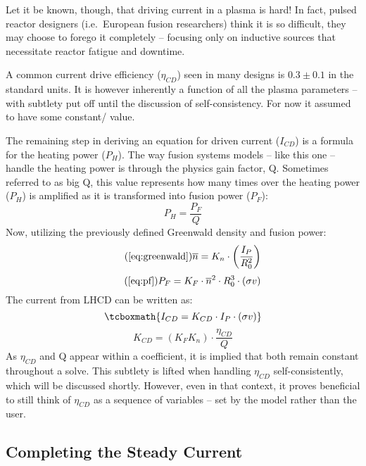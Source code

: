 Let it be known, though, that driving current in a plasma is hard! In fact, pulsed reactor designers (i.e.\ European fusion researchers) think it is so difficult, they may choose to forego it completely -- focusing only on inductive sources that necessitate reactor fatigue and downtime. 

A common current drive efficiency ($\eta_{CD}$) seen in many designs is $0.3 \pm 0.1 $ in the standard units. It is however inherently a function of all the plasma parameters -- with subtlety put off until the discussion of self-consistency. For now it assumed to have some constant/ value.

The remaining step in deriving an equation for driven current ($I_{CD}$) is a formula for the heating power ($P_H$). The way fusion systems models -- like this one -- handle the heating power is through the physics gain factor, Q. Sometimes referred to as big Q, this value represents how many times over the heating power ($P_H$) is amplified as it is transformed into fusion power ($P_F$):
\begin{equation}
	P_H = \frac{P_F}{Q}
\end{equation}
Now, utilizing the previously defined Greenwald density and fusion power:
 \begin{equation}
 	\tag{\ref{eq:greenwald}}
 	\overline n = K_n \cdot \left( \frac{I_P}{R_0^2} \right)
 \end{equation}
 \begin{equation}
	\tag{\ref{eq:pf}}
	P_F = K_F \cdot \overline{n}^2 \cdot R_0^3  \cdot (\sigma v)
\end{equation}
The current from LHCD can be written as:
\begin{equation}
	\label{eq:icd}
	\tcboxmath{
	I_{CD} = K_{CD} \cdot I_P \cdot ( \sigma v )
	}
	\myequations{Current Drive -- $I_{CD}$}
\end{equation}
\begin{equation}
	K_{CD} = \left( K_F K_n \right) \cdot \frac{\eta_{CD}}{Q}
\end{equation}
As $\eta_{CD}$ and Q appear within a  coefficient, it is implied that both remain constant throughout a solve. This subtlety is lifted when handling $\eta_{CD}$ self-consistently, which will be discussed shortly. However, even in that context, it proves beneficial to still think of $\eta_{CD}$ as a sequence of  variables -- set by the model rather than the user.

\subsection{Completing the Steady Current}

